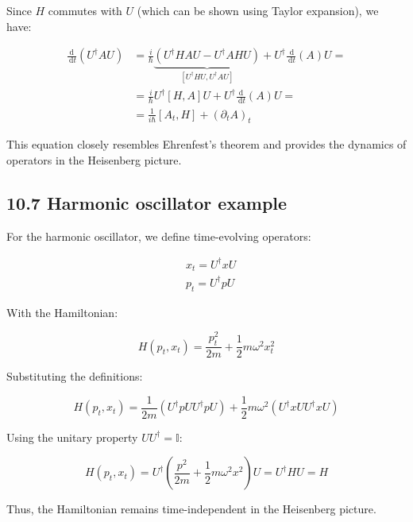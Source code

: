 \documentclass[10pt]{article}
\begin{document}
Since $H$ commutes with $U$ (which can be shown using Taylor expansion), we have:

\begin{align*}
\frac{\mathrm{d}}{\mathrm{~d} t}\left(U^{\dagger} A U\right) & =\frac{i}{\hbar} \underbrace{\left(U^{\dagger} H A U-U^{\dagger} A H U\right)}_{\left[U^{\dagger}HU, U^{\dagger}AU\right]}+U^{\dagger} \frac{\mathrm{~d}}{\mathrm{~d} t}(A) U= \\
& =\frac{i}{\hbar} U^{\dagger}[H,A]U + U^{\dagger} \frac{\mathrm{d}}{\mathrm{~d} t}(A) U= \\
& =\frac{1}{i \hbar}\left[A_{t}, H\right]+\left(\partial_{t} A\right)_{t} \tag{10.42}
\end{align*}

This equation closely resembles Ehrenfest's theorem and provides the dynamics of operators in the Heisenberg picture.

\subsection*{10.7 Harmonic oscillator example}
For the harmonic oscillator, we define time-evolving operators:

\begin{align*}
& x_{t}=U^{\dagger} x U \\
& p_{t}=U^{\dagger} p U \tag{10.43}
\end{align*}

With the Hamiltonian:

\begin{equation*}
H\left(p_{t}, x_{t}\right)=\frac{p_{t}^{2}}{2 m}+\frac{1}{2} m \omega^{2} x_{t}^{2} \tag{10.44}
\end{equation*}

Substituting the definitions:

\begin{equation*}
H\left(p_{t}, x_{t}\right)=\frac{1}{2 m}\left(U^{\dagger} p U U^{\dagger} p U\right) + \frac{1}{2} m \omega^{2}\left(U^{\dagger} x U U^{\dagger} x U\right) \tag{10.45}
\end{equation*}

Using the unitary property $U U^{\dagger}=\mathbb{I}$:

\begin{equation*}
H\left(p_{t}, x_{t}\right)=U^{\dagger}\left(\frac{p^{2}}{2 m}+\frac{1}{2} m \omega^{2} x^{2}\right) U=U^{\dagger} H U=H \tag{10.46}
\end{equation*}

Thus, the Hamiltonian remains time-independent in the Heisenberg picture.
\end{document}
